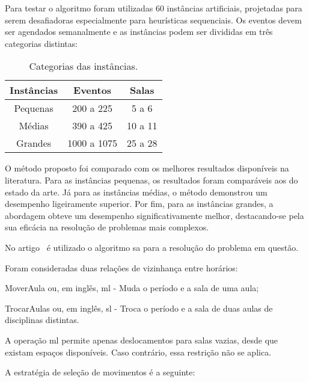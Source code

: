 Para testar o algoritmo foram utilizadas 60 instâncias artificiais, projetadas para serem desafiadoras especialmente para heurísticas sequenciais. Os eventos devem ser agendados semanalmente e as instâncias podem ser divididas em três categorias distintas:

{
\setlength{\tabcolsep}{.8em}
\begin{table}[H]
    \centering
    \caption{Categorias das instâncias.}
    \label{tabela:categorias-instancias}
    \begin{tabular}{ccc}
    \toprule
    \textbf{Instâncias} & \textbf{Eventos}     & \textbf{Salas}   \\ \midrule
    Pequenas            & 200 a 225            & 5 a 6            \\
    Médias              & 390 a 425            & 10 a 11          \\
    Grandes             & 1000 a 1075          & 25 a 28          \\
    \bottomrule
    \end{tabular}
\end{table}
}

O método proposto foi comparado com os melhores resultados disponíveis na literatura. Para as instâncias pequenas, os resultados foram comparáveis aos do estado da arte. Já para as instâncias médias, o método demonstrou um desempenho ligeiramente superior. Por fim, para as instâncias grandes, a abordagem obteve um desempenho significativamente melhor, destacando-se pela sua eficácia na resolução de problemas mais complexos.

No artigo~\cite{Featurebasedtuning-Bellio-2016} é utilizado o algoritmo \gls{sa} para a resolução do problema em questão.

Foram consideradas duas relações de vizinhança entre horários:

\begin{compactitem}
    \item MoverAula ou, em inglês, \gls{ml} - Muda o período e a sala de uma aula;

    \item TrocarAulas ou, em inglês, \gls{sl} - Troca o período e a sala de duas aulas de disciplinas distintas.
\end{compactitem}

A operação \gls{ml} permite apenas deslocamentos para salas vazias, desde que existam espaços disponíveis. Caso contrário, essa restrição não se aplica.

A estratégia de seleção de movimentos é a seguinte:

